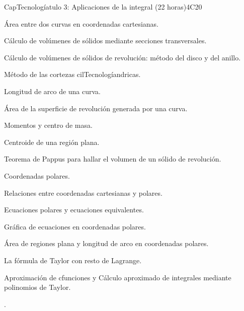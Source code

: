 \begin{syllabus}
\begin{unit}{CapTecnologíatulo 3: Aplicaciones de la integral (22 horas)}{}{}{4}{C20}


\begin{topics}
      \item Área entre dos curvas en coordenadas cartesianas. 
      \item Cálculo de volúmenes de sólidos mediante secciones transversales. 
      \item Cálculo de volúmenes de sólidos de revolución: método del disco y del anillo.
      \item Método de las cortezas cilTecnologíandricas.
      \item Longitud de arco de una curva. 
      \item Área de la superficie de revolución generada por una curva. 
      \item Momentos y centro de masa. 
      \item Centroide de una región plana. 
      \item Teorema de Pappus para hallar el volumen de un sólido de revolución.
      \item Coordenadas polares. 
      \item Relaciones entre coordenadas cartesianas y polares. 
      \item Ecuaciones polares y ecuaciones equivalentes. 
      \item Gráfica de ecuaciones en coordenadas polares.
      \item Área de regiones plana y longitud de arco en coordenadas polares. 
      \item La fórmula de Taylor con resto de Lagrange. 
      \item Aproximación de cfunciones y Cálculo aproximado de integrales mediante polinomios de 				Taylor.
\end{topics}

   \begin{learningoutcomes}
      \item .
   \end{learningoutcomes}
\end{unit}


\end{syllabus}
